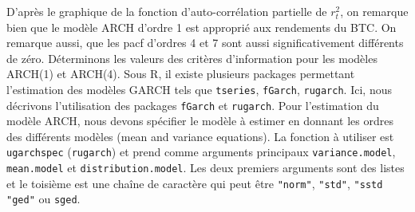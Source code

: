 \documentclass[
  ignorenonframetext,
]{beamer}
\begin{document}
\begin{frame}[fragile]
D'après le graphique de la fonction d'auto-corrélation partielle de
\(r_t^2\), on remarque bien que le modèle ARCH d'ordre 1 est approprié
aux rendements du BTC. On remarque aussi, que les pacf d'ordres 4 et 7
sont aussi significativement différents de zéro.
Déterminons les valeurs des critères d'information pour les modèles
ARCH(1) et ARCH(4).
Sous R, il existe plusieurs packages permettant l'estimation des modèles
GARCH tels que \texttt{tseries}, \texttt{fGarch}, \texttt{rugarch}.
Ici, nous décrivons l'utilisation des packages \texttt{fGarch} et
\texttt{rugarch}. Pour l'estimation du modèle ARCH, nous devons
spécifier le modèle à estimer en donnant les ordres des différents
modèles (mean and variance equations).
La fonction à utiliser est \texttt{ugarchspec} (\texttt{rugarch}) et
prend comme arguments principaux \texttt{variance.model},
\texttt{mean.model} et \texttt{distribution.model}. Les deux premiers
arguments sont des listes et le toisième est une chaîne de caractère qui
peut être \texttt{"norm"}, \texttt{"std"}, \texttt{"sstd} \texttt{"ged"}
ou \texttt{sged}.
\end{frame}
\end{document}
